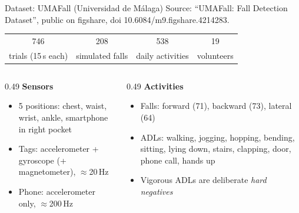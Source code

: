 \documentclass[aspectratio=169,11pt]{beamer}
\begin{document}
\begin{frame}{Dataset: UMAFall (Universidad de M\'alaga)}
\small Source: ``UMAFall: Fall Detection Dataset'', public on figshare, doi 10.6084/m9.figshare.4214283.
\vspace{0.4em}

\begin{center}
\begin{tabular}{cccc}
\textcolor{fallc}{\Huge 746} & \textcolor{fallc}{\Huge 208} & \textcolor{adlc}{\Huge 538} & \textcolor{adlc}{\Huge 19}\\
trials (15\,s each) & simulated falls & daily activities & volunteers
\end{tabular}
\end{center}
\vspace{0.3em}
\begin{columns}[T]
\begin{column}{0.49\textwidth}
\textbf{Sensors}
\begin{itemize}\small
\item 5 positions: chest, waist, wrist, ankle, smartphone in right pocket
\item Tags: accelerometer + gyroscope (+ magnetometer), $\approx$20\,Hz
\item Phone: accelerometer only, $\approx$200\,Hz
\end{itemize}
\end{column}
\begin{column}{0.49\textwidth}
\textbf{Activities}
\begin{itemize}\small
\item \alert{Falls:} forward (71), backward (73), lateral (64)
\item \textcolor{adlc}{ADLs:} walking, jogging, hopping, bending, sitting, lying down, stairs, clapping, door, phone call, hands up
\item Vigorous ADLs are deliberate \emph{hard negatives}
\end{itemize}
\end{column}
\end{columns}
\end{frame}
\end{document}

